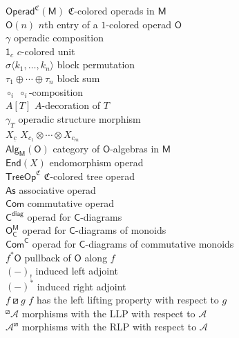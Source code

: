 \documentclass[11pt]{amsbook}
\numberwithin{section}{chapter}
\numberwithin{subsection}{section}
\numberwithin{equation}{section}
\theoremstyle{plain}
\theoremstyle{definition}
\newcommand{\cala}{\mathcal{A}}
\newcommand{\colorc}{\mathfrak{C}}
\newcommand{\C}{\mathsf{C}}
\newcommand{\M}{\mathsf{M}}
\renewcommand{\O}{\mathsf{O}}
\newcommand{\End}{\mathsf{End}}
\newcommand{\operadunit}{\mathsf{1}}
\newcommand{\compi}{\circ_i}
\newcommand{\fstar}{f^*}
\newcommand{\fstaro}{\fstar\O}
\newcommand{\Ocm}{\O_{\C}^{\M}}
\newcommand{\As}{\mathsf{As}}
\newcommand{\Cdiag}{\C^{\mathsf{diag}}}
\newcommand{\Com}{\mathsf{Com}}
\newcommand{\Comc}{\Com^{\C}}
\newcommand{\Operad}{\mathsf{Operad}}
\newcommand{\Operadc}{\Operad^{\colorc}}
\newcommand{\Operadcm}{\Operadc(\M)}
\newcommand{\Treeopc}{\mathsf{TreeOp}^{\colorc}}
\newcommand{\alg}{\mathsf{Alg}}
\newcommand{\algm}{\alg_{\M}}
\newcommand{\algmo}{\algm(\O)}
\newcommand{\uc}{\underline c}
\begin{document}
\begin{tabbing}
$\Operadcm$  $\colorc$-colored operads in $\M$\\
$\O(n)$  $n$th entry of a $1$-colored operad $\O$\\
$\gamma$  operadic composition\\
$\operadunit_c$  $c$-colored unit\\
$\sigma\langle k_1,\ldots,k_n\rangle$  block permutation\\
$\tau_1 \oplus \cdots \oplus \tau_n$  block sum\\
$\compi$  $\compi$-composition\\
$A[T]$  $A$-decoration of $T$\\
$\gamma_T$  operadic structure morphism\\
$X_{\uc}$  $X_{c_1} \otimes \cdots \otimes X_{c_m}$\\
$\algmo$  category of $\O$-algebras in $\M$\\
$\End(X)$  endomorphism operad\\
$\Treeopc$  $\colorc$-colored tree operad\\
$\As$  associative operad\\
$\Com$  commutative operad\\
$\Cdiag$  operad for $\C$-diagrams\\
$\Ocm$  operad for $\C$-diagrams of monoids\\
$\Comc$  operad for $\C$-diagrams of commutative monoids\\
$\fstaro$  pullback of $\O$ along $f$\\
$(-)_!$  induced left adjoint\\
$(-)^*$  induced right adjoint\\
$f \boxslash g$  $f$ has the left lifting property with respect to $g$\\
$^{\boxslash}\!\cala$  morphisms with the LLP with respect to $\cala$\\
$\cala^{\boxslash}$  morphisms with the RLP with respect to $\cala$\\

\end{tabbing}
\end{document}
